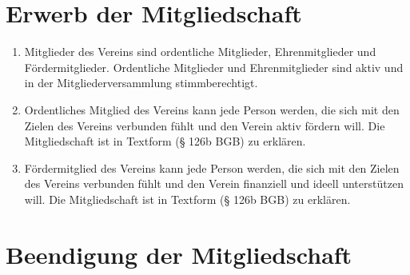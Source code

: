 \chapter{Erwerb der Mitgliedschaft}
\begin{enumerate}
	\item Mitglieder des Vereins sind ordentliche Mitglieder, Ehrenmitglieder und Fördermitglieder. Ordentliche Mitglieder und Ehrenmitglieder sind aktiv und in der Mitgliederversammlung stimmberechtigt.
	\item Ordentliches Mitglied des Vereins kann jede Person werden, die sich mit den Zielen des Vereins verbunden fühlt und den Verein aktiv fördern  will. Die Mitgliedschaft ist in Textform (§ 126b BGB) zu erklären.
	\item Fördermitglied des Vereins kann jede Person werden, die sich mit den Zielen des Vereins verbunden fühlt und den Verein finanziell und ideell  unterstützen will. Die Mitgliedschaft ist in Textform (§ 126b BGB) zu erklären.
\end{enumerate}

\chapter{Beendigung der Mitgliedschaft}

